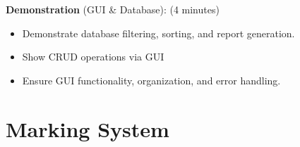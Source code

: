 \documentclass{article}
\begin{document}
\textbf{Demonstration} (GUI \& Database): (4 minutes)


\begin{itemize}


    \item Demonstrate database filtering, sorting, and report generation.


    \item Show CRUD operations via GUI


    \item Ensure GUI functionality, organization, and error handling.


\end{itemize}






\section*{Marking System}
\end{document}

